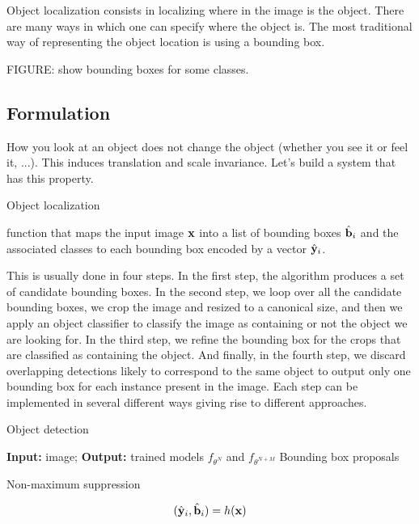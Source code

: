 Object localization consists in localizing where in the image is the object. There are many ways in which one can specify where the object is. The most traditional way of representing the object location is using a bounding box.

FIGURE: show bounding boxes for some classes.

\subsection{Formulation}

How you look at an object does not change the object (whether you see it or feel it, ...).  This induces translation and scale invariance. Let's build a system that has this property.

Object localization

function that maps the input image ${\bf x}$ into a list of bounding boxes $\hat {\bf b}_i$ and the associated classes to each bounding box encoded by a vector $\hat {\bf y}_i$.

This is usually done in four steps. In the first step, the algorithm produces a set of candidate bounding boxes. In the second step, we loop over all the candidate bounding boxes, we crop the image and resized to a canonical size, and then we apply an object classifier to classify the image as containing or not the object we are looking for. In the third step, we refine the bounding box for the crops that are classified as containing the object. And finally, in the fourth step, we discard overlapping detections likely to correspond to the same object to output only one bounding box for each instance present in the image. Each step can be implemented in several different ways giving rise to different approaches.

\begin{algorithm}[h]
	\label{object_localization}
	\SetAlgoVlined
	\DontPrintSemicolon
	\caption{Object detection}
	{\bf Input:} image;
	{\bf Output:} trained models $f_{\theta^{N}}$ and $f_{\theta^{N+M}}$\;
	Bounding box proposals\;


	Non-maximum suppression\;
\end{algorithm}



\begin{equation}
	(\hat {\bf y}_i, \hat {\bf b}_i) = h({\bf x})
\end{equation}





